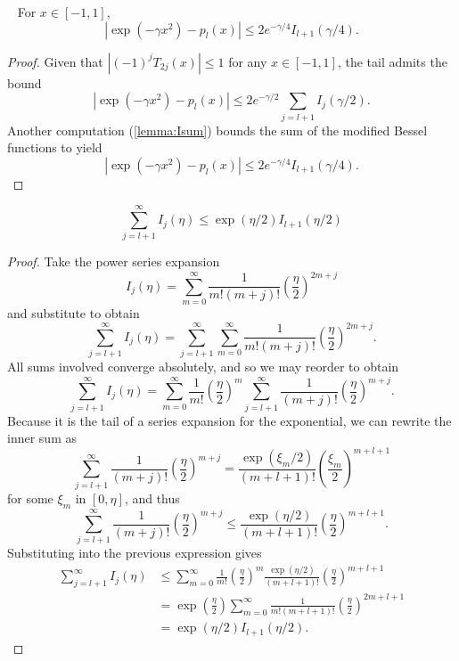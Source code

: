 \begin{lemma}~\label{lemma:errbnd}
  For $x \in [-1,1]$,
  \[
    |\exp(-\gamma x^2)-p_l(x)| \leq 2 e^{-\gamma/4} I_{l+1}(\gamma/4).
  \]
\end{lemma}
\begin{proof}
Given that
$|(-1)^j T_{2j}(x)| \leq 1$ for any $x \in [-1,1]$, the tail
admits the bound
\[
  |\exp(-\gamma x^2)-p_l(x)| \leq
  2 e^{-\gamma/2} \sum_{j=l+1} I_j(\gamma/2).
\]
Another computation (\cref{lemma:Isum}) bounds the sum of the
modified Bessel functions to yield
\[
  |\exp(-\gamma x^2)-p_l(x)| \leq
  2 e^{-\gamma/4} I_{l+1}(\gamma/4).
\]
\end{proof}


\begin{lemma}\label{lemma:Isum}
  \[
    \sum_{j=l+1}^\infty I_j(\eta) \leq \exp(\eta/2) I_{l+1}(\eta/2)
  \]
\end{lemma}
\begin{proof}
Take the power series expansion
\[
  I_j(\eta) =
    \sum_{m=0}^\infty \frac{1}{m! (m+j)!} \left(\frac{\eta}{2}\right)^{2m+j}
\]
and substitute to obtain
\[
  \sum_{j=l+1}^\infty I_j(\eta) =
    \sum_{j=l+1}^\infty \sum_{m=0}^\infty
    \frac{1}{m! (m+j)!} \left(\frac{\eta}{2}\right)^{2m+j}.
\]
All sums involved converge absolutely, and so we may reorder to obtain
\[
  \sum_{j=l+1}^\infty I_j(\eta) =
  \sum_{m=0}^\infty \frac{1}{m!} \left(\frac{\eta}{2}\right)^m
  \sum_{j=l+1}^\infty
    \frac{1}{(m+j)!} \left(\frac{\eta}{2}\right)^{m+j}.
\]
Because it is the tail of a series expansion for the exponential, we
can rewrite the inner sum as
\[
  \sum_{j=l+1}^\infty
  \frac{1}{(m+j)!} \left(\frac{\eta}{2}\right)^{m+j} =
  \frac{\exp(\xi_m/2)}{(m+l+1)!} \left(\frac{\xi_m}{2}\right)^{m+l+1}
\]
for some $\xi_m$ in $[0,\eta]$, and thus
\[
  \sum_{j=l+1}^\infty
  \frac{1}{(m+j)!} \left(\frac{\eta}{2}\right)^{m+j} \leq
  \frac{\exp(\eta/2)}{(m+l+1)!} \left(\frac{\eta}{2}\right)^{m+l+1}.
\]
Substituting into the previous expression gives
\begin{align*}
  \sum_{j=l+1}^\infty I_j(\eta)
  &\leq
  \sum_{m=0}^\infty \frac{1}{m!} \left(\frac{\eta}{2}\right)^m
  \frac{\exp(\eta/2)}{(m+l+1)!} \left(\frac{\eta}{2}\right)^{m+l+1} \\
  &=
  \exp\left(\frac{\eta}{2}\right)
  \sum_{m=0}^\infty \frac{1}{m! (m+l+1)!}
  \left(\frac{\eta}{2}\right)^{2m+l+1} \\
  &=
  \exp(\eta/2) I_{l+1}(\eta/2).
\end{align*}
\end{proof}
